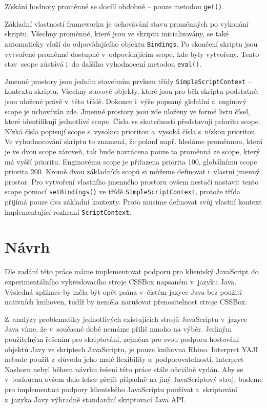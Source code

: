 \noindent Získání hodnoty proměnné se docílí obdobně -- pouze metodou \texttt{get()}.

Základní vlastností frameworku je uchovávání stavu proměnných po vykonání skriptu. Všechny proměnné, které jsou ve skriptu inicializovány, se také automaticky vloží do odpovídajícího objektu \texttt{Bindings}. Po skončení skriptu jsou vytvořené proměnné dostupné v~odpovídajícím scope, kde byly vytvořeny. Tento stav~scope  zůstává i~do dalšího vyhodnocení metodou \texttt{eval()}.

Jmenné prostory jsou jedním stavebním prvkem třídy \texttt{SimpleScriptContext} -- kontextu skriptu. Všechny stavové objekty, které jsou pro běh skriptu podstatné, jsou uložené právě v~této třídě. Dokonce i~výše popsaný globální a~enginový scope je uchováván zde. Jmenné prostory jsou zde uloženy ve formě listu čísel, které identifikují jednotlivé scope. Čísla ve skutečnosti představují prioritu scope. Nízká čísla popisují scope s~vysokou prioritou a~vysoká čísla s~nízkou prioritou. Ve vyhodnocování skriptu to znamená, že pokud např. hledáme proměnnou, která je ve dvou scope zároveň, tak bude navrácena pouze ta proměnná ze scope, který má vyšší prioritu. Enginovému scope  je přiřazena priorita 100, globálnímu scope  priorita 200. Kromě dvou základních scopů si můžeme definovat i~vlastní jmenný prostor. Pro vytvoření vlastního jmenného prostoru ovšem nestačí nastavit tento scope pomocí \texttt{setBindings()} ve třídě \texttt{SimpleScriptContext}, protože třída přijímá pouze dva základní kontexty. Proto musíme definovat svůj vlastní kontext implementující rozhraní \texttt{ScriptContext}.

\chapter{Návrh}
\label{Chapter.Design}

Dle zadání této práce máme implementovat podporu pro klientský JavaScript do experimentálního vykreslovacího stroje CSSBox napsaném v~jazyku Java. Výsledná aplikace by měla být opět psána v~čistém jazyce Java bez použití nativních knihoven, tudíž by neměla narušovat přenositelnost stroje CSSBox.

Z~analýzy problematiky jednotlivých existujících strojů JavaScriptu v~jazyce Java víme, že v~současné době nemáme příliš mnoho na výběr. Jediným použitelným řešením pro skriptování, zejména pro svou podporu hostování objektů Javy ve skriptech JavaScriptu, je pouze knihovna Rhino. Interpret YAJI nebude použit z~důvodu jeho malé flexibility a~podporovatelnosti. Interpret Nashorn nebyl během návrhu řešení této práce stále oficiálně vydán. Aby se v~budoucnu ovšem dalo lehce přejít případně na jiný JavaScriptový stroj, budeme pro implementaci podpory klientského JavaScriptu používat a~skriptování z~jazyka Javy výhradně standardní skriptovací Java API.

